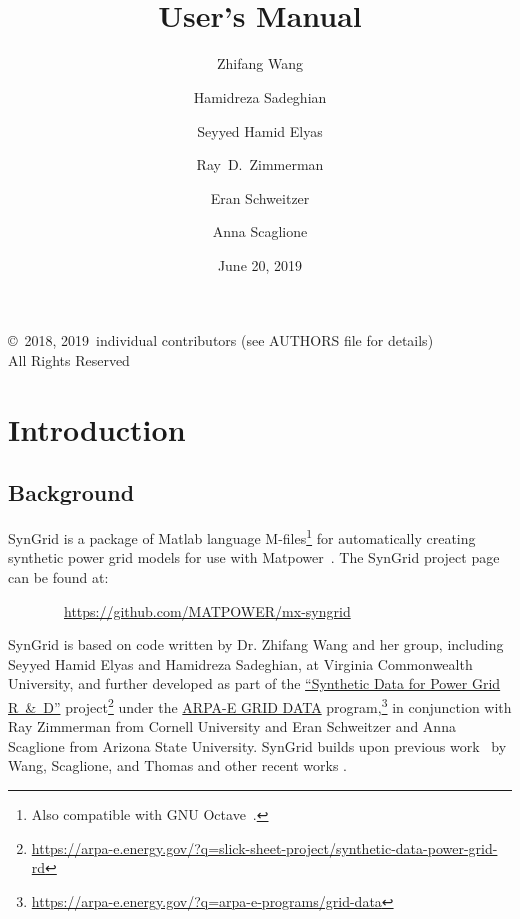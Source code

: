 \documentclass[12pt]{article}
\title{\syngrid{} \syngridver{}\\
User's Manual}
\author{Zhifang Wang \and Hamidreza Sadeghian \and Seyyed Hamid Elyas \and Ray~D.~Zimmerman \and Eran Schweitzer \and Anna Scaglione}
\date{June 20, 2019} %
\newcommand{\matlab}[0]{{\sc Matlab}}
\newcommand{\matpower}[0]{{\sc Matpower}}
\newcommand{\syngrid}[0]{{SynGrid}}
\newcommand{\syngridurl}[0]{https://github.com/MATPOWER/mx-syngrid}
\numberwithin{equation}{section}
\numberwithin{table}{section}
\numberwithin{figure}{section}
\begin{document}
\maketitle
\thispagestyle{empty}
\vfill
\begin{center}
{\scriptsize
\copyright~2018, 2019~individual contributors (see AUTHORS file for details)\\
All Rights Reserved}
\end{center}

\clearpage
\tableofcontents
\clearpage
\listoffigures
\listoftables

\clearpage
\section{Introduction}

\subsection{Background}

\syngrid{} is a package of \matlab{} language M-files\footnote{Also compatible with GNU Octave~\cite{octave}.} for automatically creating synthetic power grid models for use with \matpower{}~\cite{zimmerman2011,matpower,matpower_manual}. The \syngrid{} project page can be found at:

\bigskip

~~~~~~~~\url{\syngridurl}

\bigskip

\syngrid{} is based on code written by Dr. Zhifang Wang and her group, including Seyyed Hamid Elyas and Hamidreza Sadeghian, at Virginia Commonwealth University, and further developed as part of the \href{https://arpa-e.energy.gov/?q=slick-sheet-project/synthetic-data-power-grid-rd}{``Synthetic Data for Power Grid R~\&~D''} project\footnote{\url{https://arpa-e.energy.gov/?q=slick-sheet-project/synthetic-data-power-grid-rd}} under the \href{https://arpa-e.energy.gov/?q=arpa-e-programs/grid-data}{ARPA-E GRID DATA} program,\footnote{\url{https://arpa-e.energy.gov/?q=arpa-e-programs/grid-data}} in conjunction with Ray Zimmerman from Cornell University and Eran Schweitzer and Anna Scaglione from Arizona State University.
\syngrid{} builds upon previous work~\cite{wang2008, syngrid_nestedSW} by Wang, Scaglione, and Thomas and other recent works \cite{wang2015, syngrid_bustype, syngrid_scaling, syngrid_gen, syngrid_transmissionline, syngrid_stat, schweitzer2018mathematical}.
\end{document}
